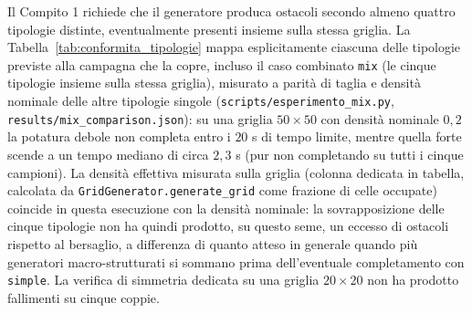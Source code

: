 \begin{table}[H]
\centering
{}
\caption{Tempo limite per ciascuna campagna. \texttt{timed\_out}: ricerca interrotta senza garanzia di ottimalità, con il miglior cammino trovato comunque restituito.}
\label{tab:timeout_policy}
\end{table}

Il Compito 1 richiede che il generatore produca ostacoli secondo almeno quattro tipologie distinte, eventualmente presenti insieme sulla stessa griglia. La Tabella~\ref{tab:conformita_tipologie} mappa esplicitamente ciascuna delle tipologie previste alla campagna che la copre, incluso il caso combinato \texttt{mix} (le cinque tipologie insieme sulla stessa griglia), misurato a parità di taglia e densità nominale delle altre tipologie singole (\texttt{scripts/esperimento\_mix.py}, \texttt{results/mix\_comparison.json}): su una griglia $50\times50$ con densità nominale $0{,}2$ la potatura debole non completa entro i $20$ s di tempo limite, mentre quella forte scende a un tempo mediano di circa $2{,}3$ s (pur non completando su tutti i cinque campioni). La densità effettiva misurata sulla griglia (colonna dedicata in tabella, calcolata da \texttt{GridGenerator.generate\_grid} come frazione di celle occupate) coincide in questa esecuzione con la densità nominale: la sovrapposizione delle cinque tipologie non ha quindi prodotto, su questo seme, un eccesso di ostacoli rispetto al bersaglio, a differenza di quanto atteso in generale quando più generatori macro-strutturati si sommano prima dell'eventuale completamento con \texttt{simple}. La verifica di simmetria dedicata su una griglia $20\times20$ non ha prodotto fallimenti su cinque coppie.

